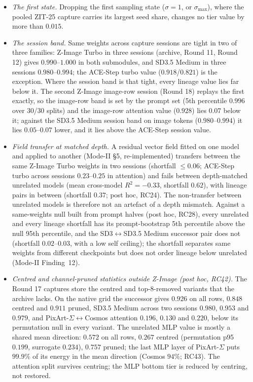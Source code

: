\documentclass[11pt]{article}
\newcommand{\TT}{ZIT-25}%
\begin{document}
\begin{itemize}
depth-invariant tangent, one that needs no grid choice, is the central open estimator question (\S\ref{sec:limits}).
 \item \emph{The first state.} Dropping the first sampling state ($\sigma=1$, or $\sigma_{\max}$), where the pooled \TT{} capture carries its largest seed share, changes no tier value by more than $0.015$.
 \item \emph{The session band.} Same weights across capture sessions are tight in two of three families: Z-Image Turbo in three sessions (archive, Round 11, Round 12) gives $0.990$--$1.000$ in both submodules, and SD3.5 Medium in three sessions $0.980$--$0.994$; the ACE-Step turbo value ($0.918$/$0.821$) is the exception. Where the session band is that tight, every lineage value lies far below it. The second Z-Image image-row session (Round 18) replays the first exactly, so the image-row band is set by the prompt set (5th percentile $0.996$ over 30/30 splits) and the image-row attention value ($0.928$) lies $0.07$ below it; against the SD3.5 Medium session band on image tokens ($0.980$--$0.994$) it lies $0.05$--$0.07$ lower, and it lies above the ACE-Step session value.
 \item \emph{Field transfer at matched depth.} A residual vector field fitted on one model and applied to another (Mode-II \S5, re-implemented) transfers between the same Z-Image Turbo weights in two sessions (shortfall $\le0.06$; ACE-Step turbo across sessions $0.23$--$0.25$ in attention) and fails between depth-matched unrelated models (mean cross-model $R^2=-0.33$, shortfall $0.62$), with lineage pairs in between (shortfall $0.37$; post hoc, RC24). The non-transfer between unrelated models is therefore not an artefact of a depth mismatch. Against a same-weights null built from prompt halves (post hoc, RC28), every unrelated and every lineage shortfall has its prompt-bootstrap 5th percentile above the null 95th percentile, and the SD3$\leftrightarrow$SD3.5 Medium successor pair does not (shortfall $0.02$--$0.03$, with a low self ceiling); the shortfall separates same weights from different checkpoints but does not order lineage below unrelated (Mode-II Finding~12).
 \item \emph{Centred and channel-pruned statistics outside Z-Image (post hoc, RC42).} The Round 17 captures store the centred and top-8-removed variants that the archive lacks. On the native grid the successor gives $0.926$ on all rows, $0.848$ centred and $0.911$ pruned, SD3.5 Medium across two sessions $0.980$, $0.953$ and $0.979$, and PixArt-$\Sigma$$\leftrightarrow$Cosmos attention $0.196$, $0.130$ and $0.220$, below its permutation null in every variant. The unrelated MLP value is mostly a shared mean direction: $0.572$ on all rows, $0.267$ centred (permutation p95 $0.199$, surrogate $0.234$), $0.757$ pruned; the last MLP layer of PixArt-$\Sigma$ puts $99.9\%$ of its energy in the mean direction (Cosmos $94\%$; RC43). The attention split survives centring; the MLP bottom tier is reduced by centring, not restored.
$$
\end{itemize}
\end{document}
